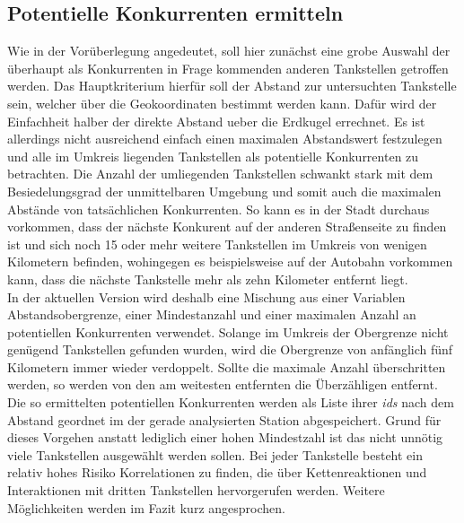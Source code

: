 \documentclass[12pt,a4paper,bibliography=totocnumbered,listof=totocnumbered]{scrartcl}
\begin{document}
\subsection{Potentielle Konkurrenten ermitteln}
Wie in der Vorüberlegung angedeutet, soll hier zunächst eine grobe Auswahl der überhaupt als Konkurrenten in Frage kommenden anderen Tankstellen getroffen werden. Das Hauptkriterium hierfür soll der Abstand zur untersuchten Tankstelle sein, welcher über die Geokoordinaten bestimmt werden kann. Dafür wird der Einfachheit halber der direkte Abstand ueber die Erdkugel errechnet. Es ist allerdings nicht ausreichend einfach einen maximalen Abstandswert festzulegen und alle im Umkreis liegenden Tankstellen als potentielle Konkurrenten zu betrachten. Die Anzahl der umliegenden Tankstellen schwankt stark mit dem Besiedelungsgrad der unmittelbaren Umgebung und somit auch die maximalen Abstände von tatsächlichen Konkurrenten. So kann es in der Stadt durchaus vorkommen, dass der nächste Konkurent auf der anderen Straßenseite zu finden ist und sich noch 15 oder mehr weitere Tankstellen im Umkreis von wenigen Kilometern befinden, wohingegen es beispielsweise auf der Autobahn vorkommen kann, dass die nächste Tankstelle mehr als zehn Kilometer entfernt liegt.\\
In der aktuellen Version wird deshalb eine Mischung aus einer Variablen Abstandsobergrenze, einer Mindestanzahl und einer maximalen Anzahl an potentiellen Konkurrenten verwendet. Solange im Umkreis der Obergrenze nicht genügend Tankstellen gefunden wurden, wird die Obergrenze von anfänglich fünf Kilometern immer wieder verdoppelt. Sollte die maximale Anzahl überschritten werden, so werden von den am weitesten entfernten die Überzähligen entfernt. Die so ermittelten potentiellen Konkurrenten werden als Liste ihrer \textit{ids} nach dem Abstand geordnet im der gerade analysierten Station abgespeichert. Grund für dieses Vorgehen anstatt lediglich einer hohen Mindestzahl ist das nicht unnötig viele Tankstellen ausgewählt werden sollen. Bei jeder Tankstelle besteht ein relativ hohes Risiko Korrelationen zu finden, die über Kettenreaktionen und Interaktionen mit dritten Tankstellen hervorgerufen werden. Weitere Möglichkeiten werden im Fazit kurz angesprochen.

\end{document}
